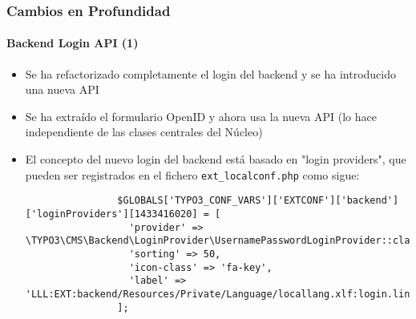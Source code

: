 \begin{frame}[fragile]
	\frametitle{Cambios en Profundidad}
	\framesubtitle{Backend Login API (1)}

	\lstset{basicstyle=\tiny\ttfamily}

	\begin{itemize}

		\item Se ha refactorizado completamente el login del backend y se ha introducido
		una nueva API

		\item Se ha extraído el formulario OpenID y ahora usa la nueva API
			(lo hace independiente de las clases centrales del Núcleo)

		\item El concepto del nuevo login del backend está basado en "login
		providers", que
			pueden ser registrados en el fichero \texttt{ext\_localconf.php} como sigue:

			\begin{lstlisting}
				$GLOBALS['TYPO3_CONF_VARS']['EXTCONF']['backend']['loginProviders'][1433416020] = [
				  'provider' => \TYPO3\CMS\Backend\LoginProvider\UsernamePasswordLoginProvider::class,
				  'sorting' => 50,
				  'icon-class' => 'fa-key',
				  'label' => 'LLL:EXT:backend/Resources/Private/Language/locallang.xlf:login.link'
				];
			\end{lstlisting}

	\end{itemize}

\end{frame}


